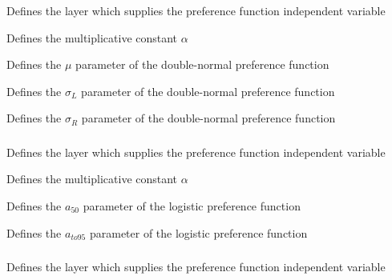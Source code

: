 \subsubsection[Double-normal]{}

 {Defines the layer which supplies the preference function independent variable}

 {Defines the multiplicative constant $\alpha$}

 {Defines the $\mu$ parameter of the double-normal preference function}

 {Defines the $\sigma_L$ parameter of the double-normal preference function}

 {Defines the $\sigma_R$ parameter of the double-normal preference function}

\subsubsection[Logistic]{}

 {Defines the layer which supplies the preference function independent variable}

 {Defines the multiplicative constant $\alpha$}

 {Defines the $a_{50}$ parameter of the logistic preference function}

 {Defines the $a_{to95}$ parameter of the logistic preference function}

\subsubsection[Inverse-logistic]{}

 {Defines the layer which supplies the preference function independent variable}

